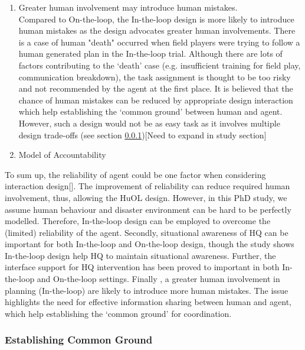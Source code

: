 \begin{enumerate}
\item Greater human involvement may introduce human mistakes. \\
Compared to On-the-loop, the In-the-loop design is more likely to introduce human mistakes as the design advocates greater human involvements. There is a case of  human "death" occurred  when field players were trying to follow a human generated plan in the In-the-loop trial.  Although there are lots of factors contributing to the `death' case (e.g. insufficient training for field play, communication breakdown), the task assignment is thought to be too risky and not recommended by the agent at the first place. It is believed that the chance of human mistakes can be reduced by appropriate design interaction which help establishing the `common ground' between human and agent. However, such a design would not be as easy task as it involves multiple design trade-offs  (see section \ref{sec:conclusionCG})[Need to expand in study section]\\

\item Model of Accountability
\end{enumerate}

To sum up, the reliability of agent could be one factor when considering interaction design[]. The improvement of reliability can reduce required human involvement, thus, allowing the HuOL design. However, in this PhD study, we assume human behaviour and disaster environment can be hard to be perfectly modelled. Therefore, In-the-loop design can be employed to overcome the (limited) reliability of the agent. Secondly, situational awareness of HQ can be important for both In-the-loop and On-the-loop design, though the study shows In-the-loop design help HQ to maintain situational awareness. Further, the interface support for HQ intervention has been proved to important in both In-the-loop and On-the-loop settings. Finally , a greater human involvement in planning (In-the-loop) are likely to introduce more human mistakes. The issue highlights the need for effective information sharing between human and agent, which help establishing the `common ground' for coordination. \\


\subsubsection{Establishing Common Ground} \label{sec:conclusionCG}

